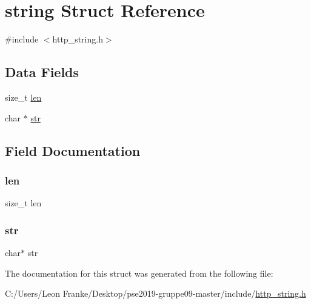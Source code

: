 \hypertarget{structstring}{}\section{string Struct Reference}
\label{structstring}


{\ttfamily \#include $<$http\+\_\+string.\+h$>$}

\subsection*{Data Fields}
\begin{DoxyCompactItemize}
\item 
size\+\_\+t \mbox{\hyperlink{structstring_a7360b55975153b822efc5217b7734e6a}{len}}
\item 
char $\ast$ \mbox{\hyperlink{structstring_ab50d783982593ef993ea0b68f7ad8b80}{str}}
\end{DoxyCompactItemize}


\subsection{Field Documentation}
\mbox{\label{structstring_a7360b55975153b822efc5217b7734e6a}} 
\subsubsection{\texorpdfstring{len}{len}}
{\footnotesize\ttfamily size\+\_\+t len}

\mbox{\label{structstring_ab50d783982593ef993ea0b68f7ad8b80}} 
\subsubsection{\texorpdfstring{str}{str}}
{\footnotesize\ttfamily char$\ast$ str}



The documentation for this struct was generated from the following file\+:\begin{DoxyCompactItemize}
\item 
C\+:/\+Users/\+Leon Franke/\+Desktop/pse2019-\/gruppe09-\/master/include/\mbox{\hyperlink{http__string_8h}{http\+\_\+string.\+h}}\end{DoxyCompactItemize}
